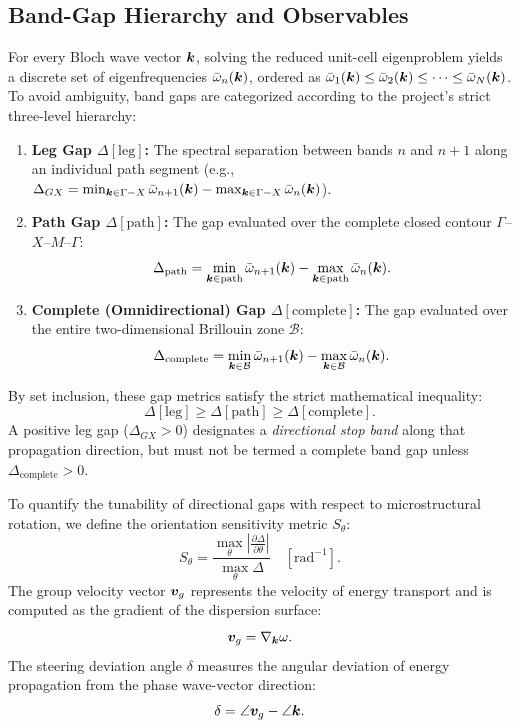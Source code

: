 \subsection{Band-Gap Hierarchy and Observables}
For every Bloch wave vector $\bm{k}$, solving the reduced unit-cell eigenproblem yields a discrete set of eigenfrequencies $\bar{\omega}_n(\bm{k})$, ordered as $\bar{\omega}_1(\bm{k}) \le \bar{\omega}_2(\bm{k}) \le \dots \le \bar{\omega}_N(\bm{k})$. To avoid ambiguity, band gaps are categorized according to the project's strict three-level hierarchy:
\begin{enumerate}[label=(\alph*)]
  \item \textbf{Leg Gap $\Delta[\mathrm{leg}]$:} The spectral separation between bands $n$ and $n+1$ along an individual path segment (e.g., $\Delta_{GX} = \min_{\bm{k} \in \Gamma-X} \bar{\omega}_{n+1}(\bm{k}) - \max_{\bm{k} \in \Gamma-X} \bar{\omega}_n(\bm{k})$).
  \item \textbf{Path Gap $\Delta[\mathrm{path}]$:} The gap evaluated over the complete closed contour $\Gamma$--$X$--$M$--$\Gamma$:
  \begin{equation}
  \Delta_{\mathrm{path}} = \min_{\bm{k} \in \text{path}} \bar{\omega}_{n+1}(\bm{k}) - \max_{\bm{k} \in \text{path}} \bar{\omega}_n(\bm{k}).
  \label{eq:delta_path}
  \end{equation}
  \item \textbf{Complete (Omnidirectional) Gap $\Delta[\mathrm{complete}]$:} The gap evaluated over the entire two-dimensional Brillouin zone $\mathcal{B}$:
  \begin{equation}
  \Delta_{\mathrm{complete}} = \min_{\bm{k} \in \mathcal{B}} \bar{\omega}_{n+1}(\bm{k}) - \max_{\bm{k} \in \mathcal{B}} \bar{\omega}_n(\bm{k}).
  \label{eq:delta_complete}
  \end{equation}
\end{enumerate}
By set inclusion, these gap metrics satisfy the strict mathematical inequality:
\begin{equation}
\Delta[\mathrm{leg}] \ge \Delta[\mathrm{path}] \ge \Delta[\mathrm{complete}].
\label{eq:gap_hierarchy}
\end{equation}
A positive leg gap ($\Delta_{GX} > 0$) designates a \emph{directional stop band} along that propagation direction, but must not be termed a complete band gap unless $\Delta_{\mathrm{complete}} > 0$.

To quantify the tunability of directional gaps with respect to microstructural rotation, we define the orientation sensitivity metric $S_\theta$:
\begin{equation}
S_\theta = \frac{\max_\theta \left| \frac{\partial \Delta}{\partial \theta} \right|}{\max_\theta \Delta} \quad [\mathrm{rad}^{-1}].
\label{eq:S_theta_def}
\end{equation}
The group velocity vector $\bm{v}_g$ represents the velocity of energy transport and is computed as the gradient of the dispersion surface:
\begin{equation}
\bm{v}_g = \nabla_{\bm{k}} \omega.
\label{eq:group_velocity}
\end{equation}
The steering deviation angle $\delta$ measures the angular deviation of energy propagation from the phase wave-vector direction:
\begin{equation}
\delta = \angle \bm{v}_g - \angle \bm{k}.
\label{eq:steering_angle}
\end{equation}
